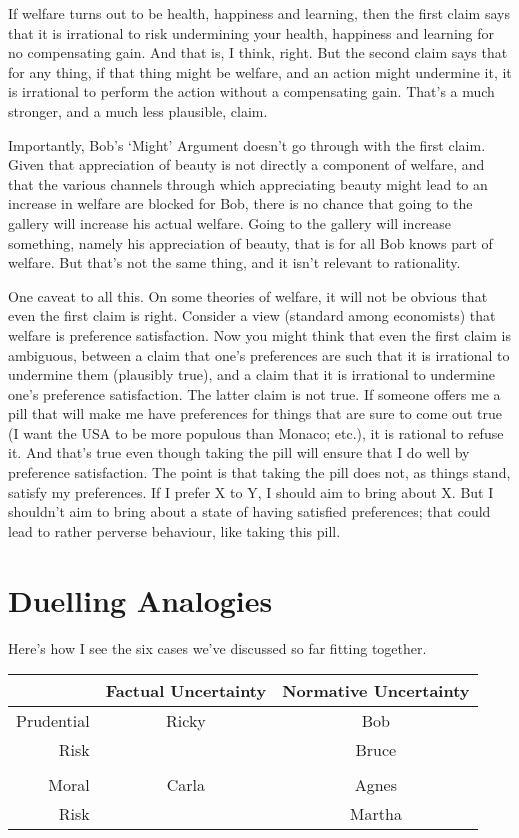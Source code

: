 \documentclass[
  10pt,
  letterpaper,
  DIV=11,
  numbers=noendperiod,
  twoside]{scrartcl}
\begin{document}
If welfare turns out to be health, happiness and learning, then the
first claim says that it is irrational to risk undermining your health,
happiness and learning for no compensating gain. And that is, I think,
right. But the second claim says that for any thing, if that thing might
be welfare, and an action might undermine it, it is irrational to
perform the action without a compensating gain. That's a much stronger,
and a much less plausible, claim.

Importantly, Bob's `Might' Argument doesn't go through with the first
claim. Given that appreciation of beauty is not directly a component of
welfare, and that the various channels through which appreciating beauty
might lead to an increase in welfare are blocked for Bob, there is no
chance that going to the gallery will increase his actual welfare. Going
to the gallery will increase something, namely his appreciation of
beauty, that is for all Bob knows part of welfare. But that's not the
same thing, and it isn't relevant to rationality.

One caveat to all this. On some theories of welfare, it will not be
obvious that even the first claim is right. Consider a view (standard
among economists) that welfare is preference satisfaction. Now you might
think that even the first claim is ambiguous, between a claim that one's
preferences are such that it is irrational to undermine them (plausibly
true), and a claim that it is irrational to undermine one's preference
satisfaction. The latter claim is not true. If someone offers me a pill
that will make me have preferences for things that are sure to come out
true (I want the USA to be more populous than Monaco; etc.), it is
rational to refuse it. And that's true even though taking the pill will
ensure that I do well by preference satisfaction. The point is that
taking the pill does not, as things stand, satisfy my preferences. If I
prefer X to Y, I should aim to bring about X. But I shouldn't aim to
bring about a state of having satisfied preferences; that could lead to
rather perverse behaviour, like taking this pill.

\section{Duelling Analogies}\label{duellinganalogies}

Here's how I see the six cases we've discussed so far fitting together.

\begin{longtable}[]{@{}rcc@{}}
\toprule\noalign{}
& Factual Uncertainty & Normative Uncertainty \\
\midrule\noalign{}
\endhead
\bottomrule\noalign{}
\endlastfoot
Prudential & Ricky & Bob \\
Risk & & Bruce \\
& & \\
Moral & Carla & Agnes \\
Risk & & Martha \\
\end{longtable}
\end{document}
